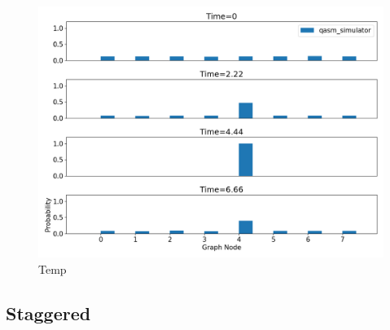 \documentclass[../../dissertation.tex]{subfiles}
\begin{document}
\begin{figure}[!h]
	\centering
	\includegraphics[scale=0.40]{img/Qiskit/ContQuantumWalk/Search/ContQW_N3_S2.png}
	\caption{Temp}
	\label{fig:contSearchResultCircQistkit}
\end{figure}

\subsection{Staggered}
\end{document}
